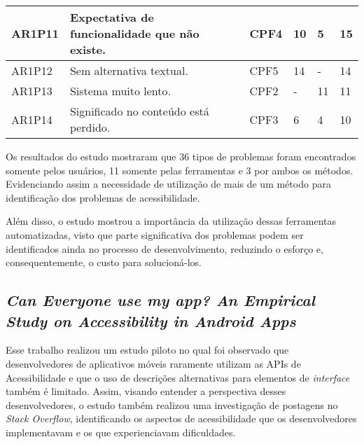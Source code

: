 \begin{table}[htb]
\begin{center}
\begin{tabular}{p{1.2cm}|p{8.7cm}|p{1.4cm}|p{0.6cm}|p{0.6cm}|p{0.7cm}}
      \hline
      AR1P11          & Expectativa de funcionalidade que não existe.                            & CPF4               & 10           & 5            & 15             \\
      \hline
      AR1P12          & Sem alternativa textual.                                                 & CPF5               & 14           & -            & 14             \\
      \hline
      AR1P13          & Sistema muito lento.                                                     & CPF2               & -            & 11           & 11             \\
      \hline
      AR1P14          & Significado no conteúdo está perdido.                                    & CPF3               & 6            & 4            & 10             \\
    \end{tabular}
  \end{center}
\end{table}

Os resultados do estudo mostraram que 36 tipos de problemas foram encontrados somente pelos usuários, 11 somente pelas ferramentas
e 3 por ambos os métodos. Evidenciando assim a necessidade de utilização de mais de um método para identificação dos problemas de
acessibilidade.

Além disso, o estudo mostrou a importância da utilização dessas ferramentas automatizadas, visto que parte significativa dos problemas
podem ser identificados ainda no processo de desenvolvimento, reduzindo o esforço e, consequentemente, o custo para solucioná-los.

\subsection{\emph{Can Everyone use my app? An Empirical Study on Accessibility in Android Apps}}

Esse trabalho realizou um estudo piloto no qual foi observado que desenvolvedores de aplicativos móveis raramente utilizam as APIs de Acessibilidade e que o uso de descrições alternativas para elementos de \emph{interface} também é limitado.
Assim, visando entender a perspectiva desses desenvolvedores, o estudo também realizou uma investigação de postagens no \emph{Stack Overflow}, identificando os aspectos de acessibilidade que os desenvolvedores implementavam e os que experienciavam dificuldades.

